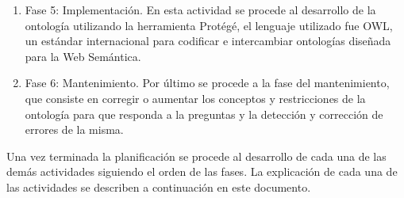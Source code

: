 \begin{enumerate}
\begin{enumerate}
\end{enumerate}
\item Fase 5: Implementación. En esta actividad se procede al desarrollo de la ontología utilizando la herramienta Protégé, el lenguaje utilizado fue OWL, un estándar internacional para codificar e intercambiar ontologías diseñada para la Web Semántica. 

\item Fase 6: Mantenimiento. Por último se procede a la fase del mantenimiento, que consiste en corregir o aumentar los conceptos y restricciones de la ontología para que responda a la preguntas y la detección y corrección de errores de la misma. 		

\end{enumerate}
Una vez terminada la planificación se procede al desarrollo de cada una de las demás actividades siguiendo el orden de las fases. La explicación de cada una de las actividades se describen a continuación en este documento.
